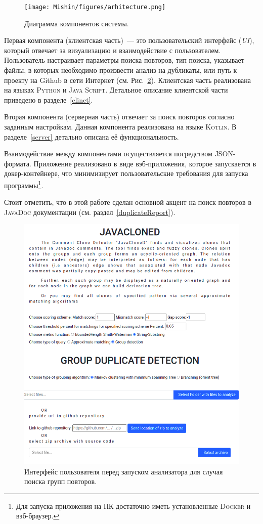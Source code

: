 \begin{figure}[H]
    \texttt{[image: Mishin/figures/arhitecture.png]}
    \caption{Диаграмма компонентов системы.}\label{fig:application}
\end{figure}


Первая компонента (клиентская часть)~--- это пользовательский интерфейс (\emph{UI}), который отвечает за визуализацию и взаимодействие с пользователем.
Пользователь настраивает параметры поиска повторов, тип поиска, указывает файлы, в которых необходимо произвести анализ на дубликаты, или путь к проекту на Github в сети Интернет (см. Рис.~\ref{fig:startApp}).
Клиентская часть реализована на языках \textsc{Python} и \textsc{Java Script}.
Детальное описание клиентской части приведено в разделе~\ref{clinet}.

Вторая компонента (серверная часть) отвечает за поиск повторов согласно заданным настройкам.
Данная компонента реализована на языке \textsc{Kotlin}.
В разделе~\ref{server} детально описана её функциональность.

Взаимодействие между компонентами осуществляется посредством \textsc{JSON}-формата.
Приложение реализовано в виде вэб-приложения, которое запускается в докер-контейнере, что минимизирует пользовательские требования для запуска программы\footnote{Для запуска приложения на ПК достаточно иметь установленные \textsc{Docker} и вэб-браузер.}.

Стоит отметить, что в этой работе сделан основной акцент на поиск повторов в \textsc{JavaDoc} документации (см. раздел~\ref{duplicateReport}).

\begin{figure}[h!]
    \centering
    \includegraphics[width=1\columnwidth]{Mishin/figures/startApp.png}
    \caption{Интерфейс пользователя перед запуском анализатора для случая поиска групп повторов.}\label{fig:startApp}
\end{figure}

